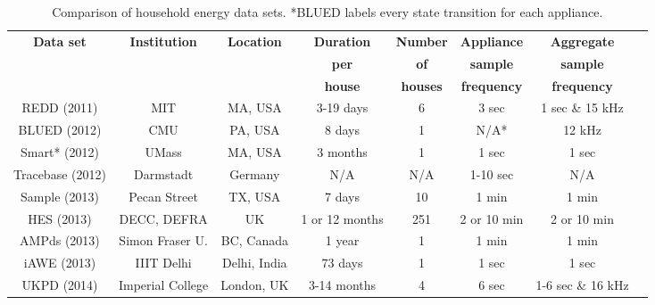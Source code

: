 \documentclass{sig-alternate}
\begin{document}
\begin{table}[]
  \centering
  \begin{tabular}{c c c c c c c c}
    \hline
    \bf Data set & \bf Institution & \bf Location & \bf Duration & \bf Number & \bf Appliance & \bf Aggregate\\
    \bf  & \bf  & \bf  & \bf per  & \bf of & \bf sample & \bf sample\\
    \bf  & \bf  & \bf  & \bf house & \bf houses & \bf frequency & \bf frequency \\
    \hline
    REDD (2011) & MIT & MA, USA & 3-19 days & 6 & 3 sec & 1 sec \& 15 kHz\\
    BLUED (2012) & CMU & PA, USA & 8 days & 1 & N/A* & 12 kHz\\
    Smart* (2012) & UMass & MA, USA & 3 months & 1 & 1 sec & 1 sec\\
    Tracebase (2012) & Darmstadt & Germany & N/A & N/A & 1-10 sec & N/A\\
    Sample (2013) & Pecan Street & TX, USA & 7 days & 10 & 1 min & 1 min\\
    HES (2013) & DECC, DEFRA & UK & 1 or 12 months & 251 & 2 or 10 min
    & 2 or 10 min\\
    AMPds (2013) & Simon Fraser U. & BC, Canada & 1 year & 1 & 1 min & 1 min\\
    iAWE (2013) & IIIT Delhi & Delhi, India & 73 days & 1 & 1 sec & 1 sec\\
    UKPD (2014) & Imperial College & London, UK & 3-14 months & 4 & 6 sec & 1-6 sec \& 16 kHz\\
    \hline
  \end{tabular}
  \caption{Comparison of household energy data sets. *BLUED labels every state transition for each appliance.}
  \label{table:datasets}
\end{table}
\end{document}
